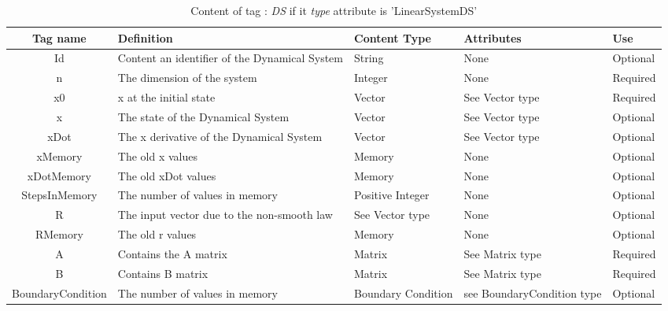 \begin{table}[!hbp]
\begin{center}
\begin{tabular}{|c|p{6cm}|p{2cm}|p{2.5cm}|p{1.5cm}|}
\hline
\bf{Tag name} & \bf{Definition} & \bf{Content Type} & \bf{Attributes} & \bf{Use}
\\\hline
\hline
Id		  & Content an identifier of the Dynamical System & String & None &  Optional \\
\hline
n		  & The dimension of the system& Integer & None &  Required \\
\hline
x0	  	  & x at the initial state & Vector & See Vector type &  Required \\
\hline
x		  & The state of the Dynamical System & Vector & See Vector type &  Optional \\
\hline
xDot		  & The x derivative of the Dynamical System & Vector & See Vector type &  Optional \\
\hline
xMemory		  & The old x values & Memory & None &  Optional \\
\hline
xDotMemory	  & The old xDot values & Memory & None &  Optional \\
\hline
StepsInMemory	  & The number of values in memory & Positive Integer & None &  Optional \\
\hline
R	  & The  input vector due to the non-smooth law & See Vector type & None &  Optional \\
\hline
RMemory	  & The old r values & Memory & None &  Optional \\
\hline
A	          & Contains the A matrix & Matrix & See Matrix type &  Required \\
\hline
B	          & Contains B matrix & Matrix & See Matrix type &  Required \\
\hline
BoundaryCondition	  & The number of values in memory & Boundary Condition & see BoundaryCondition type &  Optional \\
\hline
\end{tabular}
\end{center}
\caption{Content of tag : \textit{DS} if it \textit{type} attribute is 'LinearSystemDS'}
\label{tab-LSDS}
\end{table}


